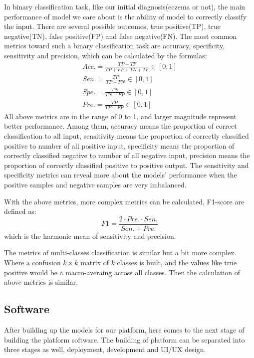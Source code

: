                     In binary classification task, like our initial diagnosis(eczema or not), the main performance of model we care about is the ability of model to correctly classify the input. There are several possible outcomes, true positive(TP), true negative(TN), false positive(FP) and false negative(FN). The most common metrics toward such a binary classification task are accuracy, specificity, sensitivity and precision\cite{rainio2024evaluation}, which can be calculated by the formulas:
                    \begin{gather*}
                        Acc. = \frac{TP+TF}{TP+FP+TN+TF} \in [0,1] \\
                        Sen. = \frac{TP}{TP+FN} \in [0,1]\\
                        Spe. = \frac{TN}{TN+FP} \in [0,1]\\
                        Pre. = \frac{TP}{TP+FP} \in [0,1]
                    \end{gather*}
                    All above metrics are in the range of 0 to 1, and larger magnitude represent better performance. Among them, accuracy means the proportion of correct classification to all input, sensitivity means the proportion of correctly classified positive to number of all positive input, specificity means the proportion of correctly classified negative to number of all negative input, precision means the proportion of correctly classified positive to positive output. The sensitivity and specificity metrics can reveal more about the models' performance when the positive samples and negative samples are very imbalanced. 

                    With the above metrics, more complex metrics can be calculated, F1-score are defined as:
                    \[
                        F1 = \frac{2\cdot Pre. \cdot Sen.}{Sen. + Pre.}
                    \]
                    which is the harmonic mean of sensitivity and precision.

                    The metrics of multi-classes classification is similar but a bit more complex. Where a confusion $k\times k$ matrix of $k$ classes is built, and the values like true positive would be a macro-averaing across all classes. Then the calculation of above metrics is similar.
        \subsection{Software}
            After building up the models for our platform, here comes to the next stage of building the platform software. The building of platform can be separated into three stages as well, deployment, development and UI/UX design. 
